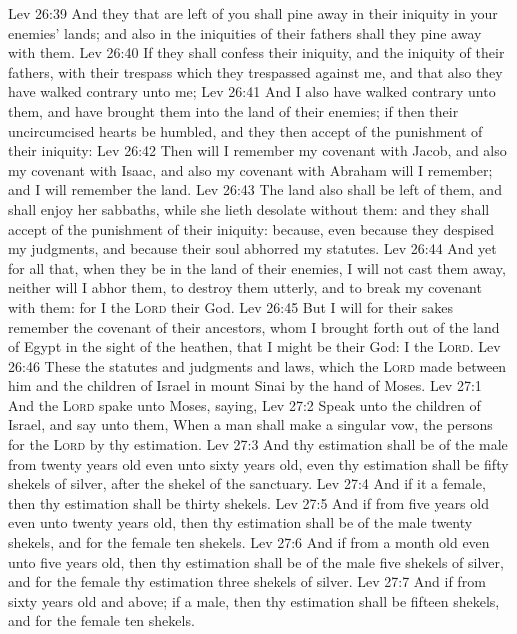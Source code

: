 \vs Lev 26:39 And they that are left of you shall pine away in their iniquity in your enemies' lands; and also in the iniquities of their fathers shall they pine away with them.
\vs Lev 26:40 If they shall confess their iniquity, and the iniquity of their fathers, with their trespass which they trespassed against me, and that also they have walked contrary unto me;
\vs Lev 26:41 And  I also have walked contrary unto them, and have brought them into the land of their enemies; if then their uncircumcised hearts be humbled, and they then accept of the punishment of their iniquity:
\vs Lev 26:42 Then will I remember my covenant with Jacob, and also my covenant with Isaac, and also my covenant with Abraham will I remember; and I will remember the land.
\vs Lev 26:43 The land also shall be left of them, and shall enjoy her sabbaths, while she lieth desolate without them: and they shall accept of the punishment of their iniquity: because, even because they despised my judgments, and because their soul abhorred my statutes.
\vs Lev 26:44 And yet for all that, when they be in the land of their enemies, I will not cast them away, neither will I abhor them, to destroy them utterly, and to break my covenant with them: for I  the \textsc{Lord} their God.
\vs Lev 26:45 But I will for their sakes remember the covenant of their ancestors, whom I brought forth out of the land of Egypt in the sight of the heathen, that I might be their God: I  the \textsc{Lord}.
\vs Lev 26:46 These  the statutes and judgments and laws, which the \textsc{Lord} made between him and the children of Israel in mount Sinai by the hand of Moses.
\vs Lev 27:1 And the \textsc{Lord} spake unto Moses, saying,
\vs Lev 27:2 Speak unto the children of Israel, and say unto them, When a man shall make a singular vow, the persons  for the \textsc{Lord} by thy estimation.
\vs Lev 27:3 And thy estimation shall be of the male from twenty years old even unto sixty years old, even thy estimation shall be fifty shekels of silver, after the shekel of the sanctuary.
\vs Lev 27:4 And if it  a female, then thy estimation shall be thirty shekels.
\vs Lev 27:5 And if  from five years old even unto twenty years old, then thy estimation shall be of the male twenty shekels, and for the female ten shekels.
\vs Lev 27:6 And if  from a month old even unto five years old, then thy estimation shall be of the male five shekels of silver, and for the female thy estimation  three shekels of silver.
\vs Lev 27:7 And if  from sixty years old and above; if  a male, then thy estimation shall be fifteen shekels, and for the female ten shekels.

